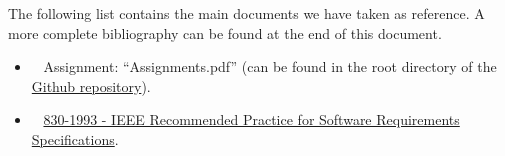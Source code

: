 The following list contains the main documents we have taken as reference. A more complete bibliography can be found at the end of this document.

\begin{itemize}
\item~ Assignment: ``Assignments.pdf'' (can be found in the root directory of the \href{https://github.com/TommasoBianchi/BettiBianchi_SWENG2}{Github repository}).
\item~ \href{http://ieeexplore.ieee.org/document/392555/}{830-1993 - IEEE Recommended Practice for Software Requirements Specifications}.
\end{itemize}